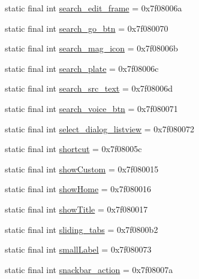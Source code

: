 \begin{CompactItemize}
\item 
static final int \hyperlink{classandroid_1_1support_1_1v7_1_1appcompat_1_1_r_1_1id_3c2060c10903b63ff303f819dba38313}{search\_\-edit\_\-frame} = 0x7f08006a
\item 
static final int \hyperlink{classandroid_1_1support_1_1v7_1_1appcompat_1_1_r_1_1id_e49956b921d575a161a8d49a87880590}{search\_\-go\_\-btn} = 0x7f080070
\item 
static final int \hyperlink{classandroid_1_1support_1_1v7_1_1appcompat_1_1_r_1_1id_e3e61c125c20c7080580b8843480c205}{search\_\-mag\_\-icon} = 0x7f08006b
\item 
static final int \hyperlink{classandroid_1_1support_1_1v7_1_1appcompat_1_1_r_1_1id_8e608182ce813b4ae8d0316015419579}{search\_\-plate} = 0x7f08006c
\item 
static final int \hyperlink{classandroid_1_1support_1_1v7_1_1appcompat_1_1_r_1_1id_22eec7652a1d5945f928d58a8044fbf3}{search\_\-src\_\-text} = 0x7f08006d
\item 
static final int \hyperlink{classandroid_1_1support_1_1v7_1_1appcompat_1_1_r_1_1id_e777ca4471eb9b4e49c2808eedd95d16}{search\_\-voice\_\-btn} = 0x7f080071
\item 
static final int \hyperlink{classandroid_1_1support_1_1v7_1_1appcompat_1_1_r_1_1id_84c2f33f1e898bf1ac8cb2bd9b3e80f7}{select\_\-dialog\_\-listview} = 0x7f080072
\item 
static final int \hyperlink{classandroid_1_1support_1_1v7_1_1appcompat_1_1_r_1_1id_04c6619454294b29d44d333fcf7cf620}{shortcut} = 0x7f08005c
\item 
static final int \hyperlink{classandroid_1_1support_1_1v7_1_1appcompat_1_1_r_1_1id_ed6da2e0de67aa4b036ad3c8acd0d718}{showCustom} = 0x7f080015
\item 
static final int \hyperlink{classandroid_1_1support_1_1v7_1_1appcompat_1_1_r_1_1id_8da4ff84bf26a190fecf465caace6c92}{showHome} = 0x7f080016
\item 
static final int \hyperlink{classandroid_1_1support_1_1v7_1_1appcompat_1_1_r_1_1id_af22bf28ac6632dc4668abd2339dbcb9}{showTitle} = 0x7f080017
\item 
static final int \hyperlink{classandroid_1_1support_1_1v7_1_1appcompat_1_1_r_1_1id_7ba60e9f5eac90f0d083d92dc83a21c1}{sliding\_\-tabs} = 0x7f0800b2
\item 
static final int \hyperlink{classandroid_1_1support_1_1v7_1_1appcompat_1_1_r_1_1id_cd9cef1da7030bce19e346b9f2e11506}{smallLabel} = 0x7f080073
\item 
static final int \hyperlink{classandroid_1_1support_1_1v7_1_1appcompat_1_1_r_1_1id_575b788c3b66848bc47cdd916c9da860}{snackbar\_\-action} = 0x7f08007a

\end{CompactItemize}
